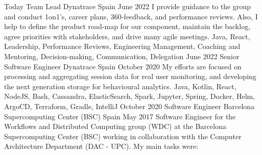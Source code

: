 %
%
%


\begin{experiences}
    \experience
        {Today}
        {Team Lead}
        {Dynatrace}
        {Spain}
        {June 2022}
        {
        I provide guidance to the group and conduct 1on1's, career plans, 360-feedback, and performance reviews. Also, I help to define the product road-map for our component, maintain the backlog, agree priorities with stakeholders, and drive many agile meetings.
        }
        {Java, React, Leadership, Performance Reviews, Engineering Management, Coaching and Mentoring, Decision-making, Communication, Delegation}
    \emptySeparator
    \experience
        {June 2022}
        {Senior Software Engineer}
        {Dynatrace}
        {Spain}
        {October 2020}
        {My efforts are focused on processing and aggregating session data for real user monitoring, and developing the next generation storage for behavioural analytics.
        }
        {Java, Kotlin, React, NodeJS, Bash, Cassandra, ElasticSearch, Spark, Jupyter, Spring, Docker, Helm, ArgoCD, Terraform, Gradle, IntelliJ}
    \emptySeparator
    \experience
        {October 2020}
        {Software Engineer}
        {Barcelona Supercomputing Center (BSC)}
        {Spain}
        {May 2017}
        {Software Engineer for the Workflows and Distributed Computing group (WDC) at the Barcelona Supercomputing Center (BSC) working in collaboration with the Computer Architecture Department (DAC - UPC). My main tasks were:
}
\end{experiences}
